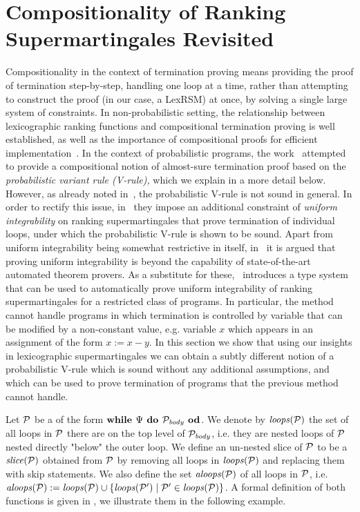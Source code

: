 \section{Compositionality of Ranking Supermartingales Revisited}
\label{sec:compositional}

Compositionality in the context of termination proving means providing the 
proof of termination step-by-step, handling one loop at a time, rather than 
attempting to construct the proof (in our case, a LexRSM) at once, by solving a 
single large system of constraints. In non-probabilistic setting, the 
relationship between lexicographic ranking functions and compositional 
termination proving is well established, as well as the importance of 
compositional proofs for efficient implementation~\cite{xxx}. In the context of 
probabilistic programs, the work~\cite{HolgerPOPL} attempted to provide a 
compositional notion of almost-sure termination proof based on the 
\emph{probabilistic variant rule (V-rule),} which we explain in a more detail 
below. 
However, as already noted in~\cite{HolgerPOPL}, the probabilistic V-rule is not 
sound in general. In order to rectify this issue, in~\cite{HolgerPOPL} they 
impose an additional constraint of \emph{uniform integrability} on ranking 
supermartingales that prove termination of individual loops, 
under which the probabilistic V-rule is shown to be sound. Apart from uniform 
integrability being somewhat restrictive in itself, in~\cite{HolgerPOPL} it is 
argued that proving uniform integrability is beyond the capability of 
state-of-the-art automated theorem provers. As a substitute for 
these,~\cite{HolgerPOPL} introduces a type system that can be used to 
automatically prove 
uniform integrability of ranking supermartingales for a restricted class of 
programs. In particular, the method cannot handle programs in which termination 
is controlled by variable that can be modified by a non-constant value, e.g. 
variable $x$ which appears in an assignment of the form $x:=x-y$. In this 
section we show that using our insights in lexicographic supermartingales we 
can obtain a subtly different notion of a probabilistic V-rule which is sound 
without any additional assumptions, and which can be used to prove termination 
of programs that the previous method cannot handle. 

Let $\mathcal{P}$ be a \PP{} of the form $\textbf{while } \Psi \textbf{ do } 
\mathcal{P}_{\mathit{body}} \textbf{ od}$. We denote by $\mathit{loops}(\mathcal{P})$ the set of all 
loops in $\mathcal{P}$ there are on the top level of $\mathcal{P}_{\mathit{body}}$, i.e. they are 
nested loops of $\mathcal{P}$ nested directly "below" the outer loop. We define an 
un-nested slice of $\mathcal{P}$ to be a \PP{} $\mathit{slice}(\mathcal{P})$ obtained from 
$\mathcal{P}$ by removing all loops in $\mathit{loops}(\mathcal{P})$ and replacing them with 
skip statements. We also define the set 
$\mathit{aloops}(\mathcal{P})$ of all loops in $\mathcal{P}$, i.e. 
$\mathit{aloops}(\mathcal{P}):=\mathit{loops}(\mathcal{P})\cup \{\mathit{loops}(\mathcal{P}')\mid \mathcal{P}'\in 
\mathit{loops}(\mathcal{P})\}$. A 
formal definition of 
both functions is given in \AppendixMaterial, we illustrate them in the 
following example.


